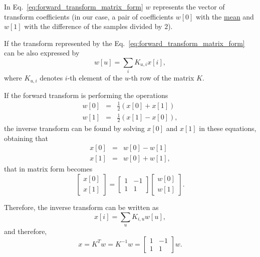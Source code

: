 In Eq.~\ref{eq:forward_transform_matrix_form} $w$ represents the
vector of transform coefficients (in our case, a pair of coefficients
$w[0]$ with the
\href{https://en.wikipedia.org/wiki/Arithmetic_mean}{mean} and $w[1]$
with the difference of the samples divided by $2$).

If the transform represented by the Eq.~\ref{eq:forward_transform_matrix_form} can be
also expressed by
\begin{equation}
  w[u] = \sum_i K_{u,i}x[i],
  \label{eq:forward_transform_linear_combination_form}
\end{equation}
where $K_{u,i}$ denotes $i$-th element of the $u$-th row of the matrix
$K$.

If the forward transform is performing the operations
\begin{equation*}
  \begin{array}{rcl}
  w[0] & = & \frac{1}{2}(x[0] + x[1])\\
  w[1] & = & \frac{1}{2}(x[1] - x[0]),
  \end{array}
\end{equation*}
the inverse transform can be found by solving $x[0]$ and $x[1]$ in
these equations, obtaining that
\begin{equation*}
  \begin{array}{rcl}
  x[0] & = & w[0] - w[1]\\
  x[1] & = & w[0] + w[1],
  \end{array}
\end{equation*}
that in matrix form becomes
\begin{equation*}
  \begin{bmatrix}
    x[0] \\
    x[1]
  \end{bmatrix}
  = 
  \begin{bmatrix} 1 & -1 \\ 1 & 1 \end{bmatrix}
  \begin{bmatrix}
    w[0] \\
    w[1]
  \end{bmatrix}.
\end{equation*}

Therefore, the inverse transform can be written as
\begin{equation}
  x[i] = \sum_u K_{i,u}w[u],
  \label{eq:inverse_transform_linear_combination_form}
\end{equation}
and therefore,
\begin{equation}
  x = K^Tw = K^{-1}w = \begin{bmatrix} 1 & -1 \\ 1 & 1 \end{bmatrix}w.
  \label{eq:inverse_transform_matrix_form}
\end{equation}

